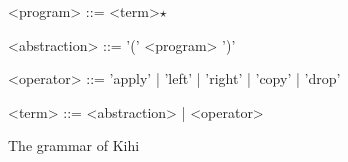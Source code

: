 \begin{figure}[htb]
    \begin{mdframed}
    
    \begin{grammar}
    <program> ::= <term>$\star$

    <abstraction> ::= '(' <program> ')'

    <operator> ::= 'apply' | 'left' | 'right' | 'copy' | 'drop'

    <term> ::= <abstraction> | <operator>
    \end{grammar}
    \end{mdframed}
    \caption{The grammar of Kihi}
    \label{fig:kihi_grammar}
\end{figure}
